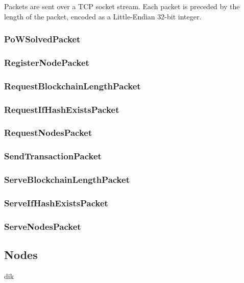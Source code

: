 \documentclass[../documentation.tex]{subfiles}
\begin{document}
Packets are sent over a TCP socket stream.
Each packet is preceded by the length of the packet,
encoded as a Little-Endian 32-bit integer.

\subsubsection{PoWSolvedPacket}


\subsubsection{RegisterNodePacket}


\subsubsection{RequestBlockchainLengthPacket}


\subsubsection{RequestIfHashExistsPacket}


\subsubsection{RequestNodesPacket}


\subsubsection{SendTransactionPacket}


\subsubsection{ServeBlockchainLengthPacket}


\subsubsection{ServeIfHashExistsPacket}


\subsubsection{ServeNodesPacket}



\subsection{Nodes}

dik
\end{document}
